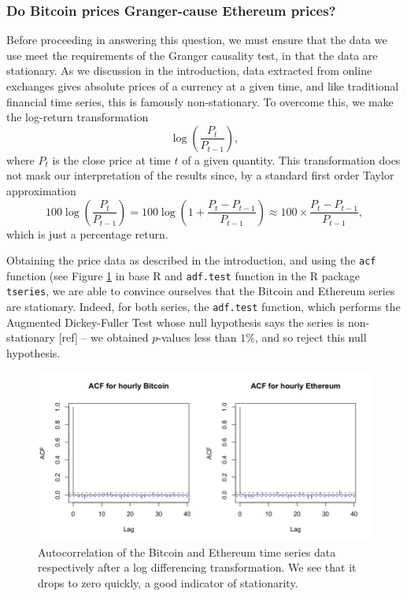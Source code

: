 \documentclass[twoside]{report}
\newcommand{\code}{\texttt}
\begin{document}
\begin{spacing}{1}
\subsubsection{Do Bitcoin prices Granger-cause Ethereum prices?}
Before proceeding in answering this question, we must ensure that the data we use meet the requirements of the Granger causality test, in that the data are stationary. As we discussion in the introduction, data extracted from online exchanges gives absolute prices of a currency at a given time, and like traditional financial time series, this is famously non-stationary. To overcome this, we make the log-return transformation \[
\log\left(\frac{P_t}{P_{t-1}}\right), 
\]
where $P_t$ is the close price at time $t$ of a given quantity. This transformation does not mask our interpretation of the results since, by a standard first order Taylor approximation \[
100\log\left(\frac{P_t}{P_{t-1}}\right) = 100\log\left(1 + \frac{P_t - P_{t-1}}{P_{t-1}}\right) \approx 100 \times \frac{P_t - P_{t-1}}{P_{t-1}},
\]
which is just a percentage return.

Obtaining the price data as described in the introduction, and using the \code{acf} function (see Figure \ref{fig:acf_btc_eth} in base R and \code{adf.test} function in the R package \code{tseries}, we are able to convince ourselves that the Bitcoin and Ethereum series are stationary. Indeed, for both series, the \code{adf.test} function, which performs the Augmented Dickey-Fuller Test whose null hypothesis says the series is non-stationary [ref] -- we obtained $p$-values less than $1\%$, and so reject this null hypothesis. 

\begin{figure}[!htbp]
    \centering
    \includegraphics[width=\linewidth]{Causality_between_time_series/acf_btc_eth.png}
    \caption{Autocorrelation of the Bitcoin and Ethereum time series data respectively after a log differencing transformation. We see that it drops to zero quickly, a good indicator of stationarity.}
    \label{fig:acf_btc_eth}
\end{figure}


\end{spacing}
\end{document}
